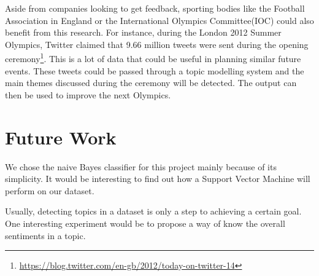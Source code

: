 Aside from companies looking to get feedback, sporting bodies like the Football Association in
England or the International Olympics Committee(IOC) could also benefit from this research. For
instance, during the London 2012 Summer Olympics, Twitter claimed that 9.66 million tweets were sent
during the opening ceremony\footnote{\url{https://blog.twitter.com/en-gb/2012/today-on-twitter-14}}.
This is a lot of data that could be useful in planning similar future events. These tweets could be
passed through a topic modelling system and the main themes discussed during the ceremony will be
detected. The output can then be used to improve the next Olympics.


\section{Future Work}
We chose the naive Bayes classifier for this project mainly because of its simplicity. It would be
interesting to find out how a Support Vector Machine will perform on our dataset.

Usually, detecting topics in a dataset is only a step to achieving a certain goal. One interesting
experiment would be to propose a way of know the overall sentiments in a topic.

